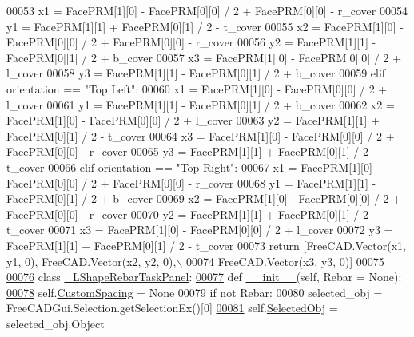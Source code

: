 \begin{DoxyCode}
00053         x1 = FacePRM[1][0] - FacePRM[0][0] / 2 + FacePRM[0][0] - r\_cover
00054         y1 = FacePRM[1][1] + FacePRM[0][1] / 2 - t\_cover
00055         x2 = FacePRM[1][0] - FacePRM[0][0] / 2 + FacePRM[0][0] - r\_cover
00056         y2 = FacePRM[1][1] - FacePRM[0][1] / 2 + b\_cover
00057         x3 = FacePRM[1][0] - FacePRM[0][0] / 2 + l\_cover
00058         y3 = FacePRM[1][1] - FacePRM[0][1] / 2 + b\_cover
00059     \textcolor{keywordflow}{elif} orientation == \textcolor{stringliteral}{"Top Left"}:
00060         x1 = FacePRM[1][0] - FacePRM[0][0] / 2 + l\_cover
00061         y1 = FacePRM[1][1] - FacePRM[0][1] / 2 + b\_cover
00062         x2 = FacePRM[1][0] - FacePRM[0][0] / 2 + l\_cover
00063         y2 = FacePRM[1][1] + FacePRM[0][1] / 2 - t\_cover
00064         x3 = FacePRM[1][0] - FacePRM[0][0] / 2 + FacePRM[0][0] - r\_cover
00065         y3 = FacePRM[1][1] + FacePRM[0][1] / 2 - t\_cover
00066     \textcolor{keywordflow}{elif} orientation == \textcolor{stringliteral}{"Top Right"}:
00067         x1 = FacePRM[1][0] - FacePRM[0][0] / 2 + FacePRM[0][0] - r\_cover
00068         y1 = FacePRM[1][1] - FacePRM[0][1] / 2 + b\_cover
00069         x2 = FacePRM[1][0] - FacePRM[0][0] / 2 + FacePRM[0][0] - r\_cover
00070         y2 = FacePRM[1][1] + FacePRM[0][1] / 2 - t\_cover
00071         x3 = FacePRM[1][0] - FacePRM[0][0] / 2 + l\_cover
00072         y3 = FacePRM[1][1] + FacePRM[0][1] / 2 - t\_cover
00073     \textcolor{keywordflow}{return} [FreeCAD.Vector(x1, y1, 0), FreeCAD.Vector(x2, y2, 0),\(\backslash\)
00074            FreeCAD.Vector(x3, y3, 0)]
00075 
\hypertarget{LShapeRebar_8py_source.tex_l00076}{}\hyperlink{classLShapeRebar_1_1__LShapeRebarTaskPanel}{00076} \textcolor{keyword}{class }\hyperlink{classLShapeRebar_1_1__LShapeRebarTaskPanel}{\_LShapeRebarTaskPanel}:
\hypertarget{LShapeRebar_8py_source.tex_l00077}{}\hyperlink{classLShapeRebar_1_1__LShapeRebarTaskPanel_af6a5f985af6f167b2817f873aa983cbf}{00077}     \textcolor{keyword}{def }\hyperlink{classLShapeRebar_1_1__LShapeRebarTaskPanel_af6a5f985af6f167b2817f873aa983cbf}{\_\_init\_\_}(self, Rebar = None):
\hypertarget{LShapeRebar_8py_source.tex_l00078}{}\hyperlink{classLShapeRebar_1_1__LShapeRebarTaskPanel_abfd2b9b6897806fd5d69316ca7f2d687}{00078}         self.\hyperlink{classLShapeRebar_1_1__LShapeRebarTaskPanel_abfd2b9b6897806fd5d69316ca7f2d687}{CustomSpacing} = \textcolor{keywordtype}{None}
00079         \textcolor{keywordflow}{if} \textcolor{keywordflow}{not} Rebar:
00080             selected\_obj = FreeCADGui.Selection.getSelectionEx()[0]
\hypertarget{LShapeRebar_8py_source.tex_l00081}{}\hyperlink{classLShapeRebar_1_1__LShapeRebarTaskPanel_a71f1ee825528164c18315a0234f6da5d}{00081}             self.\hyperlink{classLShapeRebar_1_1__LShapeRebarTaskPanel_a71f1ee825528164c18315a0234f6da5d}{SelectedObj} = selected\_obj.Object

\end{DoxyCode}
